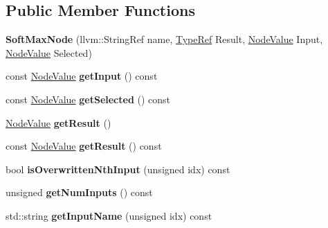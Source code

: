 \subsection*{Public Member Functions}
\begin{DoxyCompactItemize}
\item 
\mbox{\label{classglow_1_1_soft_max_node_a603e59eaadcca772c7d10fd1c2b62abc}} 
{\bfseries Soft\+Max\+Node} (llvm\+::\+String\+Ref name, \hyperlink{structglow_1_1_type}{Type\+Ref} Result, \hyperlink{structglow_1_1_node_value}{Node\+Value} Input, \hyperlink{structglow_1_1_node_value}{Node\+Value} Selected)
\item 
\mbox{\label{classglow_1_1_soft_max_node_ad82dadf03897a7a6e2f1a8f8c9b1d990}} 
const \hyperlink{structglow_1_1_node_value}{Node\+Value} {\bfseries get\+Input} () const
\item 
\mbox{\label{classglow_1_1_soft_max_node_abaaf5093e28c0be27f8ce95cb732a6d2}} 
const \hyperlink{structglow_1_1_node_value}{Node\+Value} {\bfseries get\+Selected} () const
\item 
\mbox{\label{classglow_1_1_soft_max_node_adeae554a4fae50c473f5b084affe2877}} 
\hyperlink{structglow_1_1_node_value}{Node\+Value} {\bfseries get\+Result} ()
\item 
\mbox{\label{classglow_1_1_soft_max_node_a69b21c8ab3f915828f22a6fe641d0bd9}} 
const \hyperlink{structglow_1_1_node_value}{Node\+Value} {\bfseries get\+Result} () const
\item 
\mbox{\label{classglow_1_1_soft_max_node_a938634e5356eb6030d60c05cc211995c}} 
bool {\bfseries is\+Overwritten\+Nth\+Input} (unsigned idx) const
\item 
\mbox{\label{classglow_1_1_soft_max_node_a838c50d6ffbdfb6d9291942111200216}} 
unsigned {\bfseries get\+Num\+Inputs} () const
\item 
\mbox{\label{classglow_1_1_soft_max_node_a21c76ae6f98801b86d1c23c38e0194b5}} 
std\+::string {\bfseries get\+Input\+Name} (unsigned idx) const

\end{DoxyCompactItemize}
